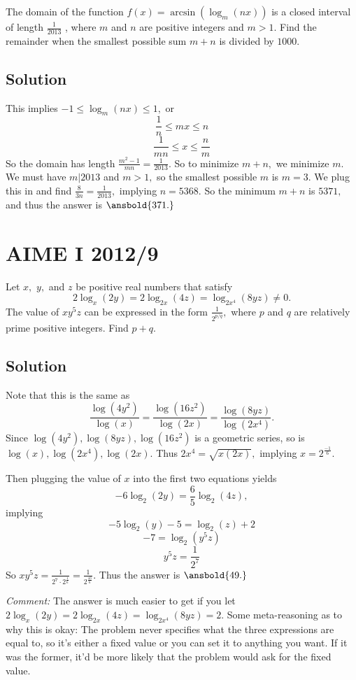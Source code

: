 \documentclass[mast]{lucky}
\begin{document}
The domain of the function $f(x) = \arcsin(\log_{m}(nx))$ is a closed interval of length $\frac{1}{2013}$ , where $m$ and $n$ are positive integers and $m>1$. Find the remainder when the smallest possible sum $m+n$ is divided by $1000.$

\subsection{Solution}

This implies $-1\leq \log_m(nx)\leq 1,$ or
    \[\frac{1}{n}\leq mx\leq n\]
    \[\frac{1}{mn}\leq x\leq \frac{n}{m}\]
    So the domain has length $\frac{m^2-1}{mn}=\frac{1}{2013}.$ So to minimize $m+n,$ we minimize $m.$ We must have $m|2013$ and $m>1,$ so the smallest possible $m$ is $m=3.$ We plug this in and find $\frac{8}{3n}=\frac{1}{2013},$ implying $n=5368.$ So the minimum $m+n$ is $5371,$ and thus the answer is $\ansbold{371.}$

\pagebreak\section{AIME I 2012/9}

Let $x,$ $y,$ and $z$ be positive real numbers that satisfy \[2\log_{x}(2y) = 2\log_{2x}(4z) = \log_{2x^4}(8yz) \ne 0.\] The value of $xy^5z$ can be expressed in the form $\frac{1}{2^{p/q}},$ where $p$ and $q$ are relatively prime positive integers. Find $p+q.$

\subsection{Solution}

Note that this is the same as
    \[\frac{\log(4y^2)}{\log(x)}=\frac{\log(16z^2)}{\log(2x)}=\frac{\log(8yz)}{\log(2x^4)}.\]
    Since $\log(4y^2),\log(8yz),\log(16z^2)$ is a geometric series, so is $\log(x),\log(2x^4),\log(2x).$ Thus $2x^4=\sqrt{x(2x)},$ implying $x=2^{\frac{-1}{6}}.$

    Then plugging the value of $x$ into the first two equations yields
    \[-6\log_{2}(2y)=\frac{6}{5}\log_{2}(4z),\]
    implying
    \[-5\log_{2}(y)-5=\log_{2}(z)+2\]
    \[-7=\log_{2}(y^5z)\]
    \[y^5z=\frac{1}{2^7}\]
    So $xy^5z=\frac{1}{2^7\cdot 2^{\frac{1}{6}}}=\frac{1}{2^{\frac{43}{6}}}.$ Thus the answer is $\ansbold{49.}$

\textit{Comment:} The answer is much easier to get if you let $2\log_{x}(2y) = 2\log_{2x}(4z) = \log_{2x^4}(8yz)=2.$ Some meta-reasoning as to why this is okay: The problem never specifies what the three expressions are equal to, so it's either a fixed value or you can set it to anything you want. If it was the former, it'd be more likely that the problem would ask for the fixed value.
\end{document}
